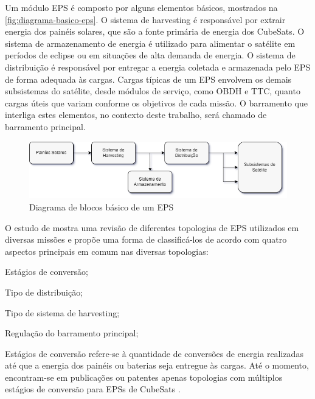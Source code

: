 Um módulo \gls{EPS} é composto por alguns elementos básicos, mostrados na \autoref{fig:diagrama-basico-eps}.
O sistema de harvesting é responsável por extrair energia dos painéis solares, que são a fonte primária de energia dos CubeSats.
O sistema de armazenamento de energia é utilizado para alimentar o satélite em períodos de eclipse ou em situações de alta demanda de energia.
O sistema de distribuição é responsável por entregar a energia coletada e armazenada pelo \gls{EPS} de forma adequada às cargas.
Cargas típicas de um \gls{EPS} envolvem os demais subsistemas do satélite, desde módulos de serviço, como \gls{OBDH} e \gls{TTC}, quanto cargas úteis que variam conforme os objetivos de cada missão.
O barramento que interliga estes elementos, no contexto deste trabalho, será chamado de barramento principal.

\begin{figure}[htp]
    \caption{Diagrama de blocos básico de um \gls{EPS}}
    \begin{center}
        \includegraphics[width=\textwidth, keepaspectratio]{images/basic-eps-block-diagram.png}
    \end{center}
    \label{fig:diagrama-basico-eps}
\end{figure}


O estudo de \textcite{comprehensive-review-eps} mostra uma revisão de diferentes topologias de \gls{EPS} utilizados em diversas missões e propõe uma forma de classificá-los de acordo com quatro aspectos principais em comum nas diversas topologias:
\begin{alineas}
    \item Estágios de conversão;
    \item Tipo de distribuição; %
    \item Tipo de sistema de harvesting;%
    \item Regulação do barramento principal;%
\end{alineas}

Estágios de conversão refere-se à quantidade de conversões de energia realizadas até que a energia dos painéis ou baterias seja entregue às cargas. Até o momento, encontram-se em publicações ou patentes apenas topologias com múltiplos estágios de conversão para \gls{EPS}s de CubeSats \cite{comprehensive-review-eps}.

